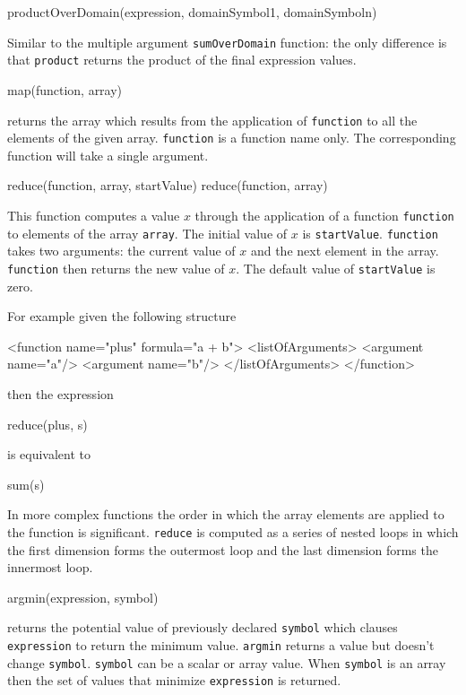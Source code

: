 \documentclass{cekarticle}
\begin{document}
\begin{example}
productOverDomain(expression, domainSymbol1, domainSymboln)
\end{example}
Similar to the multiple argument \texttt{sumOverDomain} function: the only
difference is that \texttt{product} returns the product of the final
expression values.

\begin{example}
map(function, array)
\end{example}
returns the array which results from the application of
\texttt{function} to all the elements of the given array.
\texttt{function} is a function name only.  The corresponding
function will take a single argument.

\begin{example}
reduce(function, array, startValue)
reduce(function, array)
\end{example}
This function computes a value $x$ through the application of a
function \texttt{function} to elements of the array
\texttt{array}.  The initial value of $x$ is
\texttt{startValue}.  \texttt{function} takes two arguments: the
current value of $x$ and the next element in the array.
\texttt{function} then returns the new value of $x$.
The default value of \texttt{startValue} is zero.

For example given the following structure
\begin{example}
<function name="plus" formula="a + b">
    <listOfArguments>
        <argument name="a"/>
        <argument name="b"/>
    </listOfArguments>
</function>
\end{example}
then the expression
\begin{example}
reduce(plus, s)
\end{example}
is equivalent to
\begin{example}
sum(s)
\end{example}

In more complex functions the order in which the array elements
are applied to the function is significant.  \texttt{reduce} is
computed as a series of nested loops in which the first dimension
forms the outermost loop and the last dimension forms the
innermost loop.

\begin{example}
argmin(expression, symbol)
\end{example}

returns the potential value of previously declared
\texttt{symbol} which clauses \texttt{expression} to return the
minimum value. \texttt{argmin} returns a value but doesn't change
\texttt{symbol}.  \texttt{symbol} can be a scalar or array value.
When \texttt{symbol} is an array then the set of values that
minimize \texttt{expression} is returned.
\end{document}
